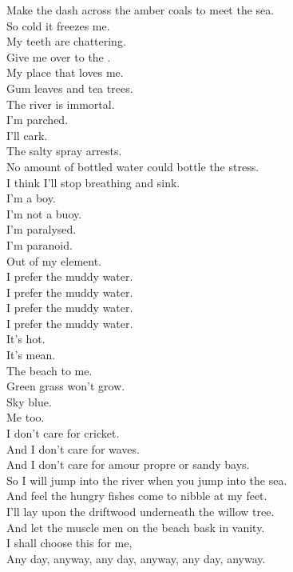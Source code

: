 Make the dash across the amber coals to meet the sea. \\
So cold it freezes me. \\
My teeth are chattering. \\
Give me over to the . \\
My place that loves me. \\
Gum leaves and tea trees. \\
The river is immortal. \\

I'm parched. \\
I'll cark. \\
The salty spray arrests. \\
No amount of bottled water could bottle the stress. \\
I think I'll stop breathing and sink. \\
I'm a boy. \\
I'm not a buoy. \\
I'm paralysed. \\
I'm paranoid. \\
Out of my element. \\

I prefer the muddy water. \\
I prefer the muddy water. \\
I prefer the muddy water. \\
I prefer the muddy water. \\

It's hot. \\
It's mean. \\
The beach to me. \\
Green grass won't grow. \\
Sky blue. \\
Me too. \\
I don't care for cricket. \\
And I don't care for waves. \\
And I don't care for amour propre or sandy bays. \\

So I will jump into the river when you jump into the sea. \\
And feel the hungry fishes come to nibble at my feet. \\
I'll lay upon the driftwood underneath the willow tree. \\
And let the muscle men on the beach bask in vanity. \\

I shall choose this  for me, \\
Any day, anyway, any day, anyway, any day, anyway. \\

